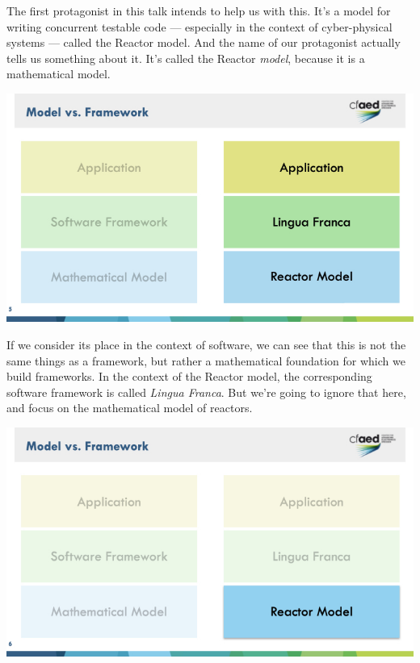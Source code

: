 \documentclass{article}
\begin{document}
The first protagonist in this talk intends to help us with this.
It's a model for writing concurrent testable code --- especially in the context of cyber-physical systems --- called the Reactor model.
And the name of our protagonist actually tells us something about it.
It's called the Reactor \emph{model}, because it is a mathematical model.

\begin{center}
    \includegraphics[width=\columnwidth]{Slides/Slide 5.jpeg}
\end{center}

If we consider its place in the context of software, we can see that this is not the same things as a framework, but rather a mathematical foundation for which we build frameworks.
In the context of the Reactor model, the corresponding software framework is called \emph{Lingua Franca}.
But we're going to ignore that here, and focus on the mathematical model of reactors.

\begin{center}
    \includegraphics[width=\columnwidth]{Slides/Slide 6.jpeg}
\end{center}
\end{document}
